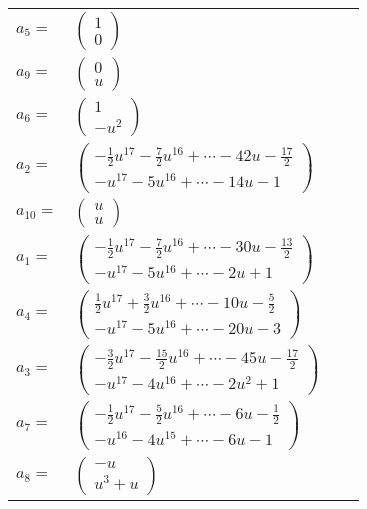 \documentclass[1p]{elsarticle_modified}
\theoremstyle{definition}
\begin{document}
\begin{tabular}{m{7pt} m{180pt} m{7pt} m{180pt} }
\flushright $a_{5}=$&$\begin{pmatrix}1\\0\end{pmatrix}$ \\
\flushright $a_{9}=$&$\begin{pmatrix}0\\u\end{pmatrix}$ \\
\flushright $a_{6}=$&$\begin{pmatrix}1\\- u^2\end{pmatrix}$ \\
\flushright $a_{2}=$&$\begin{pmatrix}-\frac{1}{2} u^{17}-\frac{7}{2} u^{16}+\cdots-42 u-\frac{17}{2}\\- u^{17}-5 u^{16}+\cdots-14 u-1\end{pmatrix}$ \\
\flushright $a_{10}=$&$\begin{pmatrix}u\\u\end{pmatrix}$ \\
\flushright $a_{1}=$&$\begin{pmatrix}-\frac{1}{2} u^{17}-\frac{7}{2} u^{16}+\cdots-30 u-\frac{13}{2}\\- u^{17}-5 u^{16}+\cdots-2 u+1\end{pmatrix}$ \\
\flushright $a_{4}=$&$\begin{pmatrix}\frac{1}{2} u^{17}+\frac{3}{2} u^{16}+\cdots-10 u-\frac{5}{2}\\- u^{17}-5 u^{16}+\cdots-20 u-3\end{pmatrix}$ \\
\flushright $a_{3}=$&$\begin{pmatrix}-\frac{3}{2} u^{17}-\frac{15}{2} u^{16}+\cdots-45 u-\frac{17}{2}\\- u^{17}-4 u^{16}+\cdots-2 u^2+1\end{pmatrix}$ \\
\flushright $a_{7}=$&$\begin{pmatrix}-\frac{1}{2} u^{17}-\frac{5}{2} u^{16}+\cdots-6 u-\frac{1}{2}\\- u^{16}-4 u^{15}+\cdots-6 u-1\end{pmatrix}$ \\
\flushright $a_{8}=$&$\begin{pmatrix}- u\\u^3+u\end{pmatrix}$ \\

\end{tabular}
\end{document}
